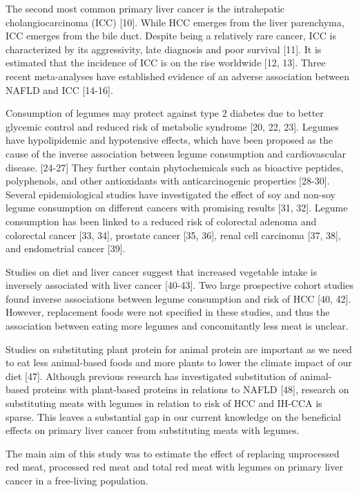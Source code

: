 \documentclass[sn-basic,Numbered,iicol,pdflatex]{sn-jnl}
\begin{document}
The second most common primary liver cancer is the intrahepatic
cholangiocarcinoma (ICC) {[}10{]}. While HCC emerges from the liver
parenchyma, ICC emerges from the bile duct. Despite being a relatively
rare cancer, ICC is characterized by its aggressivity, late diagnosis
and poor survival {[}11{]}. It is estimated that the incidence of ICC is on
the rise worldwide {[}12, 13{]}. Three recent meta-analyses have established
evidence of an adverse association between NAFLD and ICC {[}14-16{]}.

Consumption of legumes may protect against type 2 diabetes due to better
glycemic control and reduced risk of metabolic syndrome {[}20, 22, 23{]}.
Legumes have hypolipidemic and hypotensive effects, which have been
proposed as the cause of the inverse association between legume
consumption and cardiovascular disease. {[}24-27{]} They further contain
phytochemicals such as bioactive peptides, polyphenols, and other
antioxidants with anticarcinogenic properties {[}28-30{]}. Several
epidemiological studies have investigated the effect of soy and non-soy
legume consumption on different cancers with promising results {[}31, 32{]}.
Legume consumption has been linked to a reduced risk of colorectal
adenoma and colorectal cancer {[}33, 34{]}, prostate cancer {[}35, 36{]}, renal
cell carcinoma {[}37, 38{]}, and endometrial cancer {[}39{]}.

Studies on diet and liver cancer suggest that increased vegetable intake
is inversely associated with liver cancer {[}40-43{]}. Two large prospective
cohort studies found inverse associations between legume consumption and
risk of HCC {[}40, 42{]}. However, replacement foods were not specified in
these studies, and thus the association between eating more legumes and
concomitantly less meat is unclear.

Studies on substituting plant protein for animal protein are important
as we need to eat less animal-based foods and more plants to lower the
climate impact of our diet {[}47{]}. Although previous research has
investigated substitution of animal-based proteins with plant-based
proteins in relations to NAFLD {[}48{]}, research on substituting meats with
legumes in relation to risk of HCC and IH-CCA is sparse. This leaves a
substantial gap in our current knowledge on the beneficial effects on
primary liver cancer from substituting meats with legumes.

The main aim of this study was to estimate the effect of replacing
unprocessed red meat, processed red meat and total red meat with legumes
on primary liver cancer in a free-living population.
\end{document}
